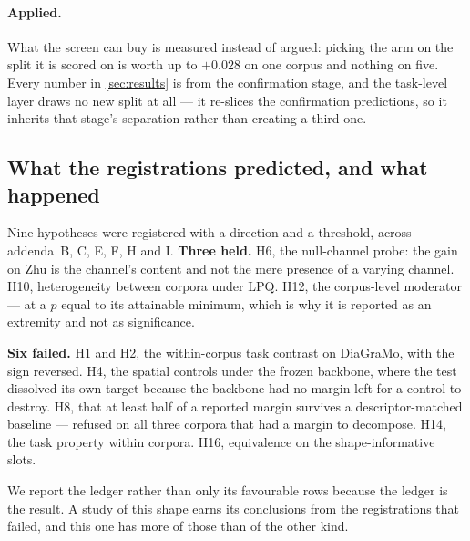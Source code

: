 \paragraph{Applied.} What the screen can buy is measured instead of argued: picking the arm on the
split it is scored on is worth up to $+0.028$ on one corpus and nothing on five. Every number in
\cref{sec:results} is from the confirmation stage, and the task-level layer draws no new split at
all --- it re-slices the confirmation predictions, so it inherits that stage's separation rather
than creating a third one.

\subsection{What the registrations predicted, and what happened}
\label{sec:stats-ledger}

Nine hypotheses were registered with a direction and a threshold, across addenda~B, C, E, F, H and
I. \textbf{Three held.} H6, the null-channel probe: the gain on Zhu is the channel's content and not
the mere presence of a varying channel. H10, heterogeneity between corpora under LPQ. H12, the
corpus-level moderator --- at a $p$ equal to its attainable minimum, which is why it is reported as
an extremity and not as significance.

\textbf{Six failed.} H1 and H2, the within-corpus task contrast on DiaGraMo, with the sign reversed.
H4, the spatial controls under the frozen backbone, where the test dissolved its own target because
the backbone had no margin left for a control to destroy. H8, that at least half of a reported
margin survives a descriptor-matched baseline --- refused on all three corpora that had a margin to
decompose. H14, the task property within corpora. H16, equivalence on the shape-informative slots.

We report the ledger rather than only its favourable rows because the ledger is the result. A study
of this shape earns its conclusions from the registrations that failed, and this one has more of
those than of the other kind.
